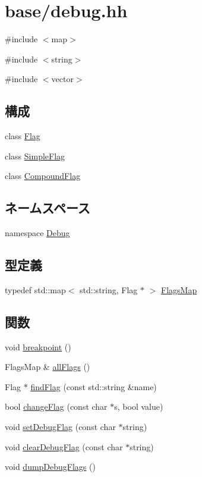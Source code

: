 \hypertarget{base_2debug_8hh}{
\section{base/debug.hh}
\label{base_2debug_8hh}
}
{\ttfamily \#include $<$map$>$}\par
{\ttfamily \#include $<$string$>$}\par
{\ttfamily \#include $<$vector$>$}\par
\subsection*{構成}
\begin{DoxyCompactItemize}
\item 
class \hyperlink{classDebug_1_1Flag}{Flag}
\item 
class \hyperlink{classDebug_1_1SimpleFlag}{SimpleFlag}
\item 
class \hyperlink{classDebug_1_1CompoundFlag}{CompoundFlag}
\end{DoxyCompactItemize}
\subsection*{ネームスペース}
\begin{DoxyCompactItemize}
\item 
namespace \hyperlink{namespaceDebug}{Debug}
\end{DoxyCompactItemize}
\subsection*{型定義}
\begin{DoxyCompactItemize}
\item 
typedef std::map$<$ std::string, Flag $\ast$ $>$ \hyperlink{namespaceDebug_a5c634388b87790d313916f2477673979}{FlagsMap}
\end{DoxyCompactItemize}
\subsection*{関数}
\begin{DoxyCompactItemize}
\item 
void \hyperlink{namespaceDebug_a874043e2396dd8ce20ec7af3ea1e2a86}{breakpoint} ()
\item 
FlagsMap \& \hyperlink{namespaceDebug_ad113f4869bfc4806ae29d67a84446683}{allFlags} ()
\item 
Flag $\ast$ \hyperlink{namespaceDebug_a49937a47d69d0ae4a3627b2097f829fa}{findFlag} (const std::string \&name)
\item 
bool \hyperlink{namespaceDebug_a0a79963bb41b5f1201bc625a735ad1de}{changeFlag} (const char $\ast$s, bool value)
\item 
void \hyperlink{base_2debug_8hh_aeb703e006fe182d90424fcd595b68570}{setDebugFlag} (const char $\ast$string)
\item 
void \hyperlink{base_2debug_8hh_aecb36a775ee01ef097d7e23111a27852}{clearDebugFlag} (const char $\ast$string)
\item 
void \hyperlink{base_2debug_8hh_a7ff54327ec09fb36dac3f025eb37af0a}{dumpDebugFlags} ()
\end{DoxyCompactItemize}


